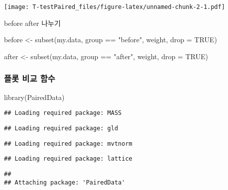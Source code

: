 \documentclass[
]{article}
\newenvironment{Shaded}{\begin{snugshade}}{\end{snugshade}}
\newcommand{\AttributeTok}[1]{\textcolor[rgb]{0.77,0.63,0.00}{#1}}
\newcommand{\ConstantTok}[1]{\textcolor[rgb]{0.00,0.00,0.00}{#1}}
\newcommand{\FunctionTok}[1]{\textcolor[rgb]{0.00,0.00,0.00}{#1}}
\newcommand{\NormalTok}[1]{#1}
\newcommand{\OtherTok}[1]{\textcolor[rgb]{0.56,0.35,0.01}{#1}}
\newcommand{\SpecialCharTok}[1]{\textcolor[rgb]{0.00,0.00,0.00}{#1}}
\newcommand{\StringTok}[1]{\textcolor[rgb]{0.31,0.60,0.02}{#1}}
\begin{document}
\texttt{[image: T-testPaired\_files/figure-latex/unnamed-chunk-2-1.pdf]}

before after 나누기

\begin{Shaded}
\begin{Highlighting}[]
\NormalTok{before }\OtherTok{\textless{}{-}} \FunctionTok{subset}\NormalTok{(my.data,  group }\SpecialCharTok{==} \StringTok{"before"}\NormalTok{, weight, }\AttributeTok{drop =} \ConstantTok{TRUE}\NormalTok{)}
\end{Highlighting}
\end{Shaded}

\begin{Shaded}
\begin{Highlighting}[]
\NormalTok{after }\OtherTok{\textless{}{-}} \FunctionTok{subset}\NormalTok{(my.data,  group }\SpecialCharTok{==} \StringTok{"after"}\NormalTok{, weight, }\AttributeTok{drop =} \ConstantTok{TRUE}\NormalTok{)}
\end{Highlighting}
\end{Shaded}

\hypertarget{uxd50cuxb86f-uxbe44uxad50-uxd568uxc218}{%
\subsubsection{플롯 비교 함수}\label{uxd50cuxb86f-uxbe44uxad50-uxd568uxc218}}

\begin{Shaded}
\begin{Highlighting}[]
\FunctionTok{library}\NormalTok{(PairedData)}
\end{Highlighting}
\end{Shaded}

\begin{verbatim}
## Loading required package: MASS
\end{verbatim}

\begin{verbatim}
## Loading required package: gld
\end{verbatim}

\begin{verbatim}
## Loading required package: mvtnorm
\end{verbatim}

\begin{verbatim}
## Loading required package: lattice
\end{verbatim}

\begin{verbatim}
## 
## Attaching package: 'PairedData'
\end{verbatim}
\end{document}
